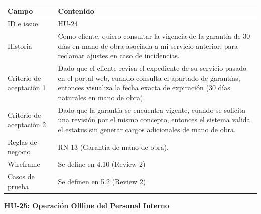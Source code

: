 {\def\LTcaptype{none} %
\begin{longtable}[]{@{}
  >{\raggedright\arraybackslash}p{}
  >{\raggedright\arraybackslash}p{}@{}}
\toprule\noalign{}
\begin{minipage}[b]{\linewidth}\raggedright
\textbf{Campo}
\end{minipage} & \begin{minipage}[b]{\linewidth}\raggedright
\textbf{Contenido}
\end{minipage} \\
\midrule\noalign{}
\endhead
\bottomrule\noalign{}
\endlastfoot
ID e issue & HU-24 \\
Historia & Como cliente, quiero consultar la vigencia de la garantía de
30 días en mano de obra asociada a mi servicio anterior, para reclamar
ajustes en caso de incidencias. \\
Criterio de aceptación 1 & Dado que el cliente revisa el expediente de
su servicio pasado en el portal web, cuando consulta el apartado de
garantías, entonces visualiza la fecha exacta de expiración (30 días
naturales en mano de obra). \\
Criterio de aceptación 2 & Dado que la garantía se encuentra vigente,
cuando se solicita una revisión por el mismo concepto, entonces el
sistema valida el estatus sin generar cargos adicionales de mano de
obra. \\
Reglas de negocio & RN-13 (Garantía de mano de obra). \\
Wireframe & Se define en 4.10 (Review 2) \\
Casos de prueba & Se definen en 5.2 (Review 2) \\
\end{longtable}
}

\textbf{HU-25: Operación Offline del Personal Interno}

